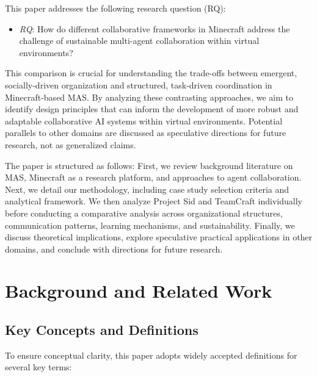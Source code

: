 \documentclass[a4paper, 12pt]{article}
\begin{document}
This paper addresses the following research question (RQ):

\begin{itemize}
    \item \textit{RQ}: How do different collaborative frameworks in Minecraft address the challenge of sustainable multi-agent collaboration within virtual environments?
\end{itemize}

This comparison is crucial for understanding the trade-offs between emergent, socially-driven organization and structured, task-driven coordination in Minecraft-based MAS. By analyzing these contrasting approaches, we aim to identify design principles that can inform the development of more robust and adaptable collaborative AI systems within virtual environments. Potential parallels to other domains are discussed as speculative directions for future research, not as generalized claims.

The paper is structured as follows: First, we review background literature on MAS, Minecraft as a research platform, and approaches to agent collaboration. Next, we detail our methodology, including case study selection criteria and analytical framework. We then analyze Project Sid and TeamCraft individually before conducting a comparative analysis across organizational structures, communication patterns, learning mechanisms, and sustainability. Finally, we discuss theoretical implications, explore speculative practical applications in other domains, and conclude with directions for future research.

\section{Background and Related Work}

\subsection{Key Concepts and Definitions}

To ensure conceptual clarity, this paper adopts widely accepted definitions for several key terms:
\end{document}
